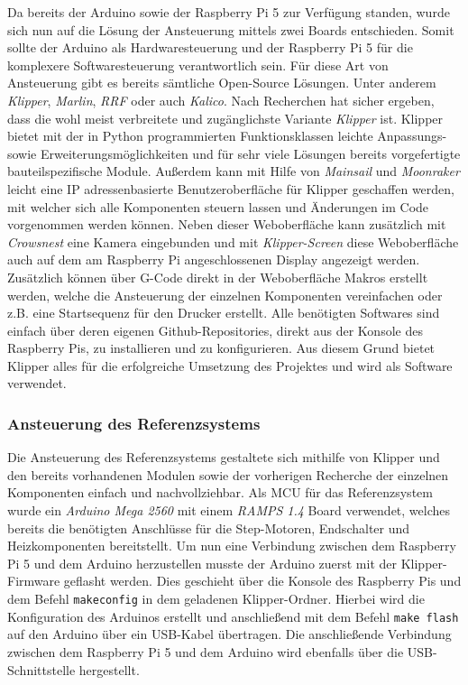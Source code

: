 \documentclass[
  ngerman,
  titlepage=true,
  listof=totoc]{scrartcl}
\begin{document}
Da bereits der Arduino sowie der Raspberry Pi 5 zur Verfügung standen,
wurde sich nun auf die Lösung der Ansteuerung mittels zwei Boards
entschieden. Somit sollte der Arduino als Hardwaresteuerung und der
Raspberry Pi 5 für die komplexere Softwaresteuerung verantwortlich sein.
Für diese Art von Ansteuerung gibt es bereits sämtliche Open-Source
Lösungen. Unter anderem \emph{Klipper}, \emph{Marlin}, \emph{RRF} oder
auch \emph{Kalico}. Nach Recherchen hat sicher ergeben, dass die wohl
meist verbreitete und zugänglichste Variante \emph{Klipper} ist. Klipper
bietet mit der in Python programmierten Funktionsklassen leichte
Anpassungs- sowie Erweiterungsmöglichkeiten und für sehr viele Lösungen
bereits vorgefertigte bauteilspezifische Module. Außerdem kann mit Hilfe
von \emph{Mainsail} und \emph{Moonraker} leicht eine IP adressenbasierte
Benutzeroberfläche für Klipper geschaffen werden, mit welcher sich alle
Komponenten steuern lassen und Änderungen im Code vorgenommen werden
können. Neben dieser Weboberfläche kann zusätzlich mit \emph{Crowsnest}
eine Kamera eingebunden und mit \emph{Klipper-Screen} diese
Weboberfläche auch auf dem am Raspberry Pi angeschlossenen Display
angezeigt werden. Zusätzlich können über G-Code direkt in der
Weboberfläche Makros erstellt werden, welche die Ansteuerung der
einzelnen Komponenten vereinfachen oder z.B. eine Startsequenz für den
Drucker erstellt. Alle benötigten Softwares sind einfach über deren
eigenen Github-Repositories, direkt aus der Konsole des Raspberry Pis,
zu installieren und zu konfigurieren. Aus diesem Grund bietet Klipper
alles für die erfolgreiche Umsetzung des Projektes und wird als Software
verwendet.

\newpage

\subsubsection{Ansteuerung des
Referenzsystems}\label{ansteuerung-des-referenzsystems}

Die Ansteuerung des Referenzsystems gestaltete sich mithilfe von Klipper
und den bereits vorhandenen Modulen sowie der vorherigen Recherche der
einzelnen Komponenten einfach und nachvollziehbar. Als MCU für das
Referenzsystem wurde ein \emph{Arduino Mega 2560} mit einem \emph{RAMPS
1.4} Board verwendet, welches bereits die benötigten Anschlüsse für die
Step-Motoren, Endschalter und Heizkomponenten bereitstellt. Um nun eine
Verbindung zwischen dem Raspberry Pi 5 und dem Arduino herzustellen
musste der Arduino zuerst mit der Klipper-Firmware geflasht werden. Dies
geschieht über die Konsole des Raspberry Pis und dem Befehl
\texttt{makeconfig} in dem geladenen Klipper-Ordner. Hierbei wird die
Konfiguration des Arduinos erstellt und anschließend mit dem Befehl
\texttt{make\ flash} auf den Arduino über ein USB-Kabel übertragen. Die
anschließende Verbindung zwischen dem Raspberry Pi 5 und dem Arduino
wird ebenfalls über die USB-Schnittstelle hergestellt.
\end{document}
